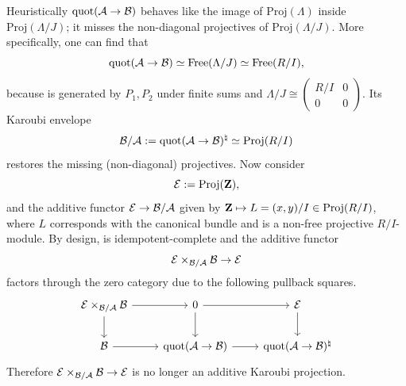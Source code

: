 \documentclass[a4paper,10pt, oneside]{amsart}
\begin{document}
\begin{exam}
		Heuristically $\mathrm{quot}(\mathcal{A}\to\mathcal{B})$ behaves like the image of $\mathrm{Proj}(\Lambda)$ inside $\mathrm{Proj}(\Lambda/J)$; it misses the non-diagonal projectives of $\mathrm{Proj}(\Lambda/J)$. More specifically, one can  find that $$\mathrm{quot}(\mathcal{A}\to\mathcal{B})\simeq \mathrm{Free}(\Lambda/J)\simeq \mathrm{Free}(R/I),$$ because \mcb is generated by $P_1, P_2$ under finite sums and $
		\Lambda/J\cong \begin{pmatrix}R/I & 0\\ 0 & 0\end{pmatrix}.
		$
		Its Karoubi envelope $$\mathcal{B}/\mathcal{A}:=\mathrm{quot}(\mathcal{A}\to\mathcal{B})^{\natural}\simeq \mathrm{Proj}(R/I)$$ restores the missing (non-diagonal) projectives. Now  consider 
		\[
		\mathcal{E} :=  \mathrm{Proj}(\mathbf{Z}),
		\]
		and the additive functor $\mathcal{E} \to \mathcal{B}/\mathcal{A}$ given by $\mathbf{Z}\mapsto L=(x,y)/I \in \mathrm{Proj}(R/I)$, where $L$ corresponds with the canonical bundle  and is a non-free projective $R/I$-module. By design, %
		\mce is idempotent-complete and the additive functor $$\mathcal{E}\times_{\mathcal{B}/\mathcal{A}} \mathcal{B}\to \mathcal{E}$$
		factors through the zero category due to the following pullback squares.
		$$\begin{tikzcd}
			\mce\times_{\mcb/\mca} \mcb \arrow[d] \arrow[r] & 0 \arrow[d] \arrow[r] & \mce \arrow[d]         \\
			\mcb \arrow[r]                                         & \mathrm{quot}(\mca\to\mcb) \arrow[r]   & \mathrm{quot}(\mca\to\mcb)^{\natural}
		\end{tikzcd}$$
		Therefore $\mathcal{E}\times_{\mathcal{B}/\mathcal{A}} \mathcal{B}\to \mathcal{E}$ is no longer an additive Karoubi projection.
	\end{exam}
	
\end{document}
